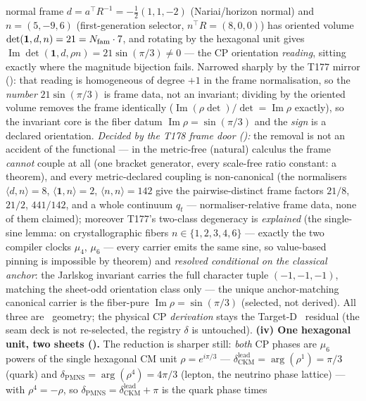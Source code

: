 \begin{winbox}
normal frame $d=a^\top R^{-1}=-\tfrac12(1,1,-2)$ (Nariai/horizon normal) and $n=(5,-9,6)$ (first-generation
selector, $n^\top R=(8,0,0)$) has oriented volume $\det(\mathbf1,d,n)=21=N_{\mathrm{fam}}\cdot7$, and rotating by the
hexagonal unit gives $\operatorname{Im}\det(\mathbf1,d,\rho n)=21\sin(\pi/3)\neq0$ --- the CP orientation
\emph{reading}, sitting exactly where the magnitude bijection fails. Narrowed sharply by the T177
mirror (): that reading is homogeneous of degree $+1$ in the
frame normalisation, so the \emph{number} $21\sin(\pi/3)$ is frame data, not an invariant; dividing by
the oriented volume removes the frame identically
($\operatorname{Im}(\rho\det)/\det=\operatorname{Im}\rho$ exactly), so the invariant core is the fiber
datum $\operatorname{Im}\rho=\sin(\pi/3)$ and the \emph{sign} is a declared orientation.
\emph{Decided by the T178 frame door ():} the removal is not an accident
of the functional --- in the metric-free (natural) calculus the frame \emph{cannot} couple at all
(one bracket generator, every scale-free ratio constant: a theorem), and every metric-declared
coupling is non-canonical (the normalisers $\langle d,n\rangle=8$, $\langle\mathbf1,n\rangle=2$,
$\langle n,n\rangle=142$ give the pairwise-distinct frame factors $21/8$, $21/2$, $441/142$, and a
whole continuum $q_t$ --- normaliser-relative frame data, none of them claimed); moreover T177's
two-class degeneracy is \emph{explained} (the single-sine lemma: on crystallographic fibers
$n\in\{1,2,3,4,6\}$ --- exactly the two compiler clocks $\mu_4$, $\mu_6$ --- every carrier emits the
same sine, so value-based pinning is impossible by theorem) and \emph{resolved conditional on the
classical anchor}: the Jarlskog invariant carries the full character tuple $(-1,-1,-1)$, matching the
sheet-odd orientation class only --- the unique anchor-matching canonical carrier is the fiber-pure
$\operatorname{Im}\rho=\sin(\pi/3)$ (selected, not derived). All three are \mE\
geometry; the physical CP \emph{derivation} stays the Target-D \mC\ residual (the seam deck is not
re-selected, the registry $\delta$ is untouched). \textbf{(iv) One hexagonal unit, two sheets
(\veri{v231\_cp\_mu6\_phases.py}).} The reduction is sharper still: \emph{both} CP phases are $\mu_6$ powers
of the single hexagonal CM unit $\rho=e^{i\pi/3}$ --- $\delta_{\mathrm{CKM}}^{\mathrm{lead}}=\arg(\rho^1)
=\pi/3$ (quark) and $\delta_{\mathrm{PMNS}}=\arg(\rho^4)=4\pi/3$ (lepton, the neutrino phase lattice) --- with
$\rho^4=-\rho$, so $\delta_{\mathrm{PMNS}}=\delta_{\mathrm{CKM}}^{\mathrm{lead}}+\pi$ is the quark phase times

\end{winbox}
